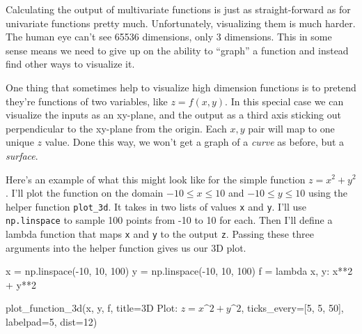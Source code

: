 \documentclass[
  letterpaper,
  DIV=11,
  numbers=noendperiod]{scrreprt}
\newenvironment{Shaded}{\begin{snugshade}}{\end{snugshade}}
\newcommand{\DecValTok}[1]{\textcolor[rgb]{0.68,0.00,0.00}{#1}}
\newcommand{\KeywordTok}[1]{\textcolor[rgb]{0.00,0.23,0.31}{#1}}
\newcommand{\NormalTok}[1]{\textcolor[rgb]{0.00,0.23,0.31}{#1}}
\newcommand{\OperatorTok}[1]{\textcolor[rgb]{0.37,0.37,0.37}{#1}}
\newcommand{\StringTok}[1]{\textcolor[rgb]{0.13,0.47,0.30}{#1}}
\begin{document}
Calculating the output of multivariate functions is just as
straight-forward as for univariate functions pretty much. Unfortunately,
visualizing them is much harder. The human eye can't see 65536
dimensions, only 3 dimensions. This in some sense means we need to give
up on the ability to ``graph'' a function and instead find other ways to
visualize it.

One thing that sometimes help to visualize high dimension functions is
to pretend they're functions of two variables, like \(z=f(x,y)\). In
this special case we can visualize the inputs as an xy-plane, and the
output as a third axis sticking out perpendicular to the xy-plane from
the origin. Each \(x,y\) pair will map to one unique \(z\) value. Done
this way, we won't get a graph of a \emph{curve} as before, but a
\emph{surface}.

Here's an example of what this might look like for the simple function
\(z=x^2+y^2\). I'll plot the function on the domain
\(-10 \leq x \leq 10\) and \(-10 \leq y \leq 10\) using the helper
function \texttt{plot\_3d}. It takes in two lists of values \texttt{x}
and \texttt{y}. I'll use \texttt{np.linspace} to sample 100 points from
-10 to 10 for each. Then I'll define a lambda function that maps
\texttt{x} and \texttt{y} to the output \texttt{z}. Passing these three
arguments into the helper function gives us our 3D plot.

\begin{Shaded}
\begin{Highlighting}[]
\NormalTok{x }\OperatorTok{=}\NormalTok{ np.linspace(}\OperatorTok{{-}}\DecValTok{10}\NormalTok{, }\DecValTok{10}\NormalTok{, }\DecValTok{100}\NormalTok{)}
\NormalTok{y }\OperatorTok{=}\NormalTok{ np.linspace(}\OperatorTok{{-}}\DecValTok{10}\NormalTok{, }\DecValTok{10}\NormalTok{, }\DecValTok{100}\NormalTok{)}
\NormalTok{f }\OperatorTok{=} \KeywordTok{lambda}\NormalTok{ x, y: x}\OperatorTok{**}\DecValTok{2} \OperatorTok{+}\NormalTok{ y}\OperatorTok{**}\DecValTok{2}
\end{Highlighting}
\end{Shaded}

\begin{Shaded}
\begin{Highlighting}[]
\NormalTok{plot\_function\_3d(x, y, f, title}\OperatorTok{=}\StringTok{\textquotesingle{}3D Plot: $z=x\^{}2+y\^{}2$\textquotesingle{}}\NormalTok{, }
\NormalTok{                 ticks\_every}\OperatorTok{=}\NormalTok{[}\DecValTok{5}\NormalTok{, }\DecValTok{5}\NormalTok{, }\DecValTok{50}\NormalTok{], labelpad}\OperatorTok{=}\DecValTok{5}\NormalTok{, dist}\OperatorTok{=}\DecValTok{12}\NormalTok{)}
\end{Highlighting}
\end{Shaded}
\end{document}
